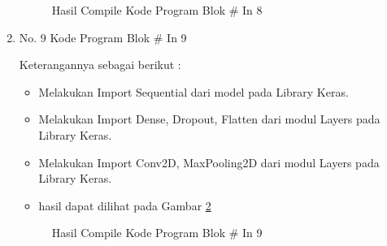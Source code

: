 \begin{enumerate}
\begin{figure}[!htbp]
      \caption{Hasil Compile Kode Program Blok \# In 8}
      \label{refer19}
\end{figure}

\item No. 9 Kode Program Blok \# In 9
\par 
Keterangannya sebagai berikut :
\begin{itemize}
\item Melakukan Import Sequential dari model pada Library Keras.
\item Melakukan Import Dense, Dropout, Flatten dari modul Layers pada Library Keras.
\item Melakukan Import Conv2D, MaxPooling2D dari modul Layers pada Library Keras.
\item hasil dapat dilihat pada Gambar \ref{refer20}
\end{itemize}

\begin{figure}[!htbp]
      \caption{Hasil Compile Kode Program Blok \# In 9}
      \label{refer20}
\end{figure}


\end{enumerate}
